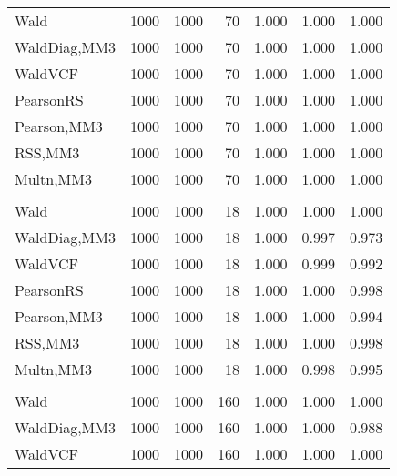\documentclass[
]{article}
\begin{document}
\begin{table}[H]
{\begin{tabular}[t]{lrrrrrr}
\hspace{1em}Wald & 1000 & 1000 & 70 & 1.000 & 1.000 & 1.000\\
\hspace{1em}WaldDiag,MM3 & 1000 & 1000 & 70 & 1.000 & 1.000 & 1.000\\
\hspace{1em}WaldVCF & 1000 & 1000 & 70 & 1.000 & 1.000 & 1.000\\
\hspace{1em}PearsonRS & 1000 & 1000 & 70 & 1.000 & 1.000 & 1.000\\
\hspace{1em}Pearson,MM3 & 1000 & 1000 & 70 & 1.000 & 1.000 & 1.000\\
\hspace{1em}RSS,MM3 & 1000 & 1000 & 70 & 1.000 & 1.000 & 1.000\\
\hspace{1em}Multn,MM3 & 1000 & 1000 & 70 & 1.000 & 1.000 & 1.000\\
\addlinespace[0.3em]
\multicolumn{7}{l}{\textbf{2F 10V}}\\
\hspace{1em}Wald & 1000 & 1000 & 18 & 1.000 & 1.000 & 1.000\\
\hspace{1em}WaldDiag,MM3 & 1000 & 1000 & 18 & 1.000 & 0.997 & 0.973\\
\hspace{1em}WaldVCF & 1000 & 1000 & 18 & 1.000 & 0.999 & 0.992\\
\hspace{1em}PearsonRS & 1000 & 1000 & 18 & 1.000 & 1.000 & 0.998\\
\hspace{1em}Pearson,MM3 & 1000 & 1000 & 18 & 1.000 & 1.000 & 0.994\\
\hspace{1em}RSS,MM3 & 1000 & 1000 & 18 & 1.000 & 1.000 & 0.998\\
\hspace{1em}Multn,MM3 & 1000 & 1000 & 18 & 1.000 & 0.998 & 0.995\\
\addlinespace[0.3em]
\multicolumn{7}{l}{\textbf{3F 15V}}\\
\hspace{1em}Wald & 1000 & 1000 & 160 & 1.000 & 1.000 & 1.000\\
\hspace{1em}WaldDiag,MM3 & 1000 & 1000 & 160 & 1.000 & 1.000 & 0.988\\
\hspace{1em}WaldVCF & 1000 & 1000 & 160 & 1.000 & 1.000 & 1.000\\

\end{tabular}}
\end{table}
\end{document}
